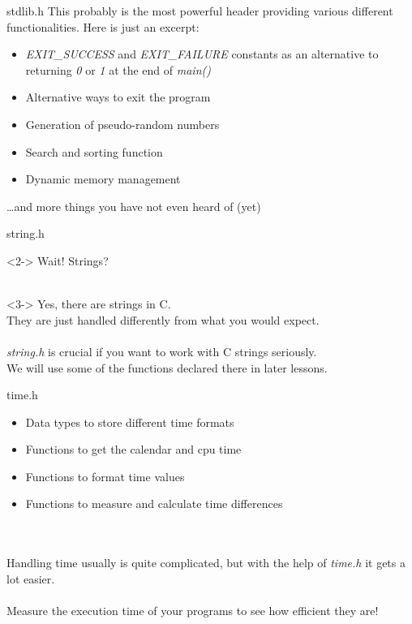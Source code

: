 \begin{frame}{stdlib.h}
	This probably is the most powerful header providing various different functionalities. Here is just an excerpt:
	\begin{itemize}
		\item \textit{EXIT\_SUCCESS} and \textit{EXIT\_FAILURE} constants as an alternative to returning \textit{0} or \textit{1} at the end of \textit{main()}
		\item Alternative ways to exit the program
		\item Generation of pseudo-random numbers
		\item Search and sorting function
		\item Dynamic memory management
	\end{itemize}
		\dots and more things you have not even heard of (yet)
\end{frame}
\begin{frame}{string.h}
	\begin{uncoverenv}<2->
		Wait! Strings? \\ \ \\
	\end{uncoverenv}
	\begin{uncoverenv}<3->
		Yes, there are strings in C. \\
		They are just handled differently from what you would expect. \\ \ \\
		\textit{string.h} is crucial if you want to work with C strings seriously. \\
		We will use some of the functions declared there in later lessons.
	\end{uncoverenv}
\end{frame}
\begin{frame}{time.h}
	\begin{itemize}
		\item Data types to store different time formats
		\item Functions to get the calendar and cpu time
		\item Functions to format time values
		\item Functions to measure and calculate time differences
	\end{itemize} \ \\ \ \\
	Handling time usually is quite complicated, but with the help of \textit{time.h} it gets a lot easier.\\
	\ \\
	Measure the execution time of your programs to see how efficient they are!
\end{frame}

